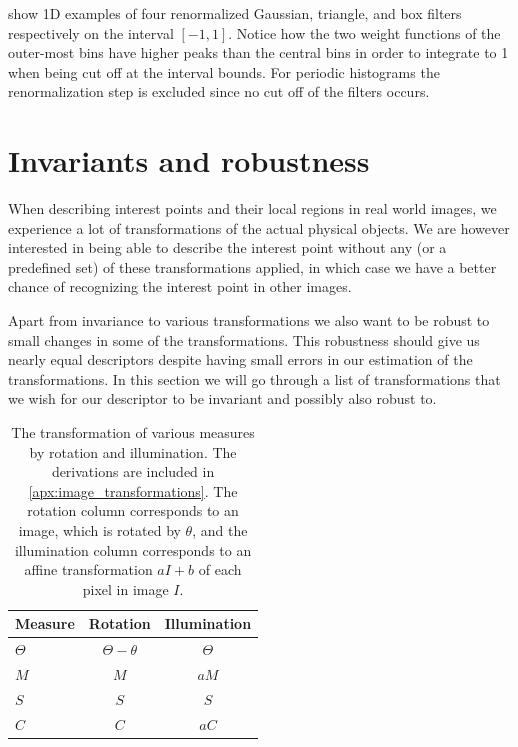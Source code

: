 \documentclass[thesis.tex]{subfiles}
\begin{document}
 show 1D examples of four renormalized Gaussian, triangle, and box filters respectively on the interval $[-1,1]$. Notice how the two weight functions of the outer-most bins have higher peaks than the central bins in order to integrate to 1 when being cut off at the interval bounds. For periodic histograms the renormalization step is excluded since no cut off of the filters occurs.
%
\section{Invariants and robustness}
When describing interest points and their local regions in real world images, we experience a lot of transformations of the actual physical objects. We are however interested in being able to describe the interest point without any (or a predefined set) of these transformations applied, in which case we have a better chance of recognizing the interest point in other images.

Apart from invariance to various transformations we also want to be robust to small changes in some of the transformations. This robustness should give us nearly equal descriptors despite having small errors in our estimation of the transformations.
In this section we will go through a list of transformations that we wish for our descriptor to be invariant and possibly also robust to.

\begin{table}[tb]
	\centering
	\begin{tabular}{l c c}
	\toprule
	Measure & Rotation & Illumination \\
	\midrule
	$\Theta$ & $\Theta - \theta $ & $\Theta$ \\
	$M$ & $M$ & $a M$ \\
	$S$ & $S$ & $S$ \\
	$C$ & $C$ & $a C$ \\
	\bottomrule
	\end{tabular}
	\caption{The transformation of various measures by rotation and illumination. The derivations are included in \cref{apx:image_transformations}. The rotation column corresponds to an image, which is rotated by $\theta$, and the illumination column corresponds to an affine transformation $aI+b$ of each pixel in image $I$.}
	\label{tbl:measureInvariances}
\end{table}
\end{document}
